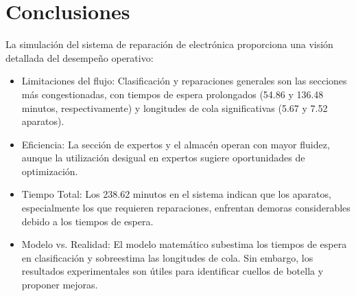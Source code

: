 \documentclass[12pt]{article}
\begin{document}
\section{Conclusiones}
La simulación del sistema de reparación de electrónica proporciona una visión detallada del desempeño operativo:
\begin{itemize}
    \item Limitaciones del flujo: Clasificación y reparaciones generales son las secciones más congestionadas, con tiempos de espera prolongados (54.86 y 136.48 minutos, respectivamente) y longitudes de cola significativas (5.67 y 7.52 aparatos).
    \item Eficiencia: La sección de expertos y el almacén operan con mayor fluidez, aunque la utilización desigual en expertos sugiere oportunidades de optimización.
    \item Tiempo Total: Los 238.62 minutos en el sistema indican que los aparatos, especialmente los que requieren reparaciones, enfrentan demoras considerables debido a los tiempos de espera.
    \item Modelo vs. Realidad: El modelo matemático subestima los tiempos de espera en clasificación y sobreestima las longitudes de cola. Sin embargo, los resultados experimentales son útiles para identificar cuellos de botella y proponer mejoras.
\end{itemize}
\end{document}
